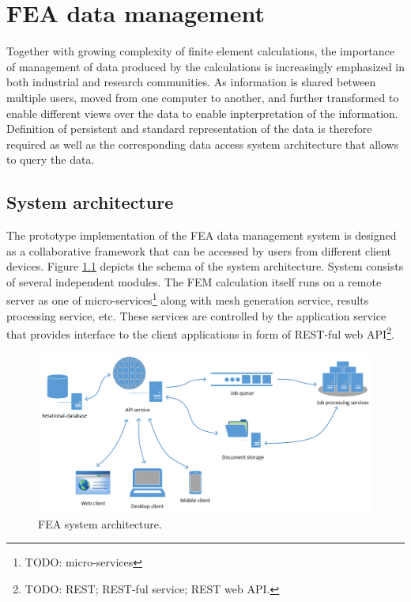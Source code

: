 \chapter{FEA data management}
\label{chapter:data-management}

Together with growing complexity of finite element calculations, the importance of management of data produced by the calculations is increasingly emphasized in both industrial and research communities. As information is shared between multiple users, moved from one computer to another, and further transformed to enable different views over the data to enable inpterpretation of the information. Definition of persistent and standard representation of the data is therefore required as well as the corresponding data access system architecture that allows to query the data.

\section{System architecture}
\label{sec:system-architecture}

The prototype implementation of the FEA data management system is designed as a collaborative framework that can be accessed by users from different client devices. Figure \ref{fig:FEA-architecture} depicts the schema of the system architecture. System consists of several independent modules. The FEM calculation itself runs on a remote server as one of micro-services\footnote{TODO: micro-services} along with mesh generation service, results processing service, etc. These services are controlled by the application service that provides interface to the client applications in form of REST-ful web API\footnote{TODO: REST; REST-ful service; REST web API.}.

\begin{figure}[H]
    \centering
    \includegraphics[width=\textwidth]{figures/FEA-architecture}
    \decoRule
    \caption{FEA system architecture.}
    \label{fig:FEA-architecture}
\end{figure}

